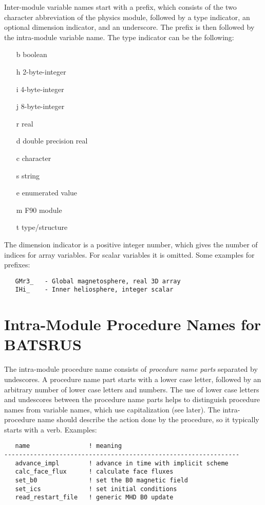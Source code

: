 Inter-module variable names start with a prefix, which
consists of the two character abbreviation of the physics module,
followed by a type indicator, an optional dimension indicator,
and an underscore. The prefix is then followed by the
intra-module variable name. The type indicator can be
the following:
\begin{itemize}
\item[b] boolean
\item[h] 2-byte-integer
\item[i] 4-byte-integer
\item[j] 8-byte-integer
\item[r] real
\item[d] double precision real
\item[c] character
\item[s] string
\item[e] enumerated value
\item[m] F90 module
\item[t] type/structure
\end{itemize}
The dimension indicator is a positive integer number, which
gives the number of indices for array variables. For scalar
variables it is omitted. Some examples for prefixes:
\begin{verbatim}
   GMr3_   - Global magnetosphere, real 3D array
   IHi_    - Inner heliosphere, integer scalar
\end{verbatim}

\section{Intra-Module Procedure Names for BATSRUS}

The intra-module procedure name consists of 
{\it procedure name parts} separated by undescores. 
A procedure name part starts with a lower case letter, followed
by an arbitrary number of lower case letters and numbers.
The use of lower case letters and undescores between the procedure 
name parts helps to distinguish procedure names from variable names, 
which use capitalization (see later).
The intra-procedure name should describe the action done
by the procedure, so it typically starts with a verb. Examples:
\begin{verbatim}
   name                ! meaning
----------------------------------------------------------------
   advance_impl        ! advance in time with implicit scheme
   calc_face_flux      ! calculate face fluxes
   set_b0              ! set the B0 magnetic field
   set_ics             ! set initial conditions
   read_restart_file   ! generic MHD B0 update
\end{verbatim}


